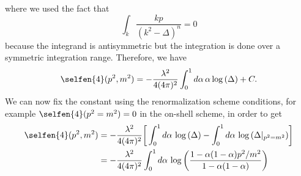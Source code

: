 where we used the fact that
\begin{equation}
    \int_k\frac{kp}{(k^2 - \Delta)^n} = 0
\end{equation}
because the integrand is antisymmetric but the integration is done over a symmetric integration range. Therefore, we have
\begin{equation}
    \selfen{4}(p^2,m^2) = -\frac{\lambda^2}{4(4\pi)^2}\int_0^1d\alpha\,\alpha\log{(\Delta)} + C.
\end{equation}
We can now fix the constant using the renormalization scheme conditions, for example $\selfen{4}(p^2 = m^2) = 0$ in the on-shell scheme, in order to get
\begin{equation}
    \begin{split}
        \selfen{4}(p^2,m^2) &= -\frac{\lambda^2}{4(4\pi)^2}\bigg[\int_0^1d\alpha\,\log{(\Delta)} - \int_0^1d\alpha\,\log{(\Delta|_{p^2 = m^2})}\bigg] \\
        &= -\frac{\lambda^2}{4(4\pi)^2}\int_0^1d\alpha\,\log{\bigg(\frac{1 - \alpha(1 - \alpha)p^2/m^2}{1 - \alpha(1- \alpha)}\bigg)}
    \end{split}
\end{equation}


